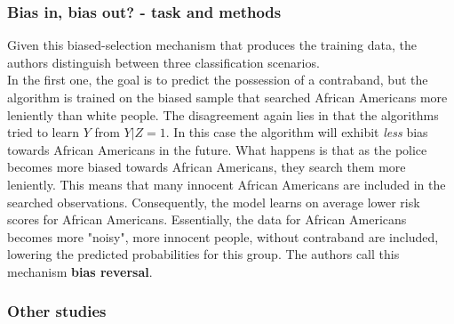 \subsubsection*{Bias in, bias out? - task and methods}
Given this biased-selection mechanism that produces the training data, the authors distinguish between three classification scenarios.\\
In the first one, the goal is to predict the possession of a contraband, but the algorithm is trained on the biased sample that searched African Americans more leniently than white people. The disagreement again lies in that the algorithms tried to learn $Y$ from $Y | Z = 1$. In this case the algorithm will exhibit \textit{less} bias towards African Americans in the future. What happens is that as the police becomes more biased towards African Americans, they search them more leniently. This means that many innocent African Americans are included in the searched observations. Consequently, the model learns on average lower risk scores for African Americans. Essentially, the data for African Americans becomes more "noisy", more innocent people, without contraband are included, lowering the predicted probabilities for this group. The authors call this mechanism \textbf{bias reversal}.



\subsubsection*{Other studies}




